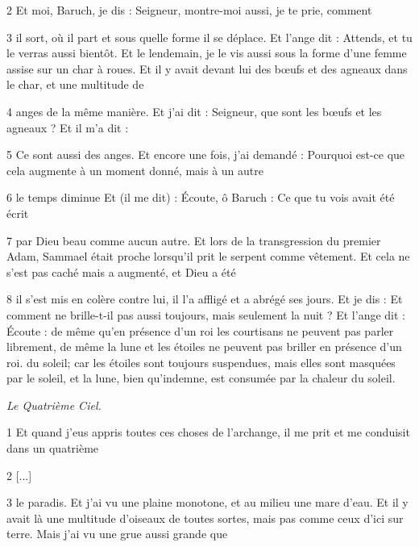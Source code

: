 \par 2 Et moi, Baruch, je dis : Seigneur, montre-moi aussi, je te prie, comment

\par 3 il sort, où il part et sous quelle forme il se déplace. Et l'ange dit : Attends, et tu le verras aussi bientôt. Et le lendemain, je le vis aussi sous la forme d'une femme assise sur un char à roues. Et il y avait devant lui des bœufs et des agneaux dans le char, et une multitude de

\par 4 anges de la même manière. Et j'ai dit : Seigneur, que sont les bœufs et les agneaux ? Et il m'a dit :

\par 5 Ce sont aussi des anges. Et encore une fois, j'ai demandé : Pourquoi est-ce que cela augmente à un moment donné, mais à un autre

\par 6 le temps diminue Et (il me dit) : Écoute, ô Baruch : Ce que tu vois avait été écrit

\par 7 par Dieu beau comme aucun autre. Et lors de la transgression du premier Adam, Sammael était proche lorsqu'il prit le serpent comme vêtement. Et cela ne s'est pas caché mais a augmenté, et Dieu a été

\par 8 il s'est mis en colère contre lui, il l'a affligé et a abrégé ses jours. Et je dis : Et comment ne brille-t-il pas aussi toujours, mais seulement la nuit ? Et l'ange dit : Écoute : de même qu'en présence d'un roi les courtisans ne peuvent pas parler librement, de même la lune et les étoiles ne peuvent pas briller en présence d'un roi. du soleil; car les étoiles sont toujours suspendues, mais elles sont masquées par le soleil, et la lune, bien qu'indemne, est consumée par la chaleur du soleil.


\par \textit{Le Quatrième Ciel.}

\par 1 Et quand j'eus appris toutes ces choses de l'archange, il me prit et me conduisit dans un quatrième

\par 2 [...]

\par 3 le paradis. Et j'ai vu une plaine monotone, et au milieu une mare d'eau. Et il y avait là une multitude d’oiseaux de toutes sortes, mais pas comme ceux d’ici sur terre. Mais j'ai vu une grue aussi grande que

